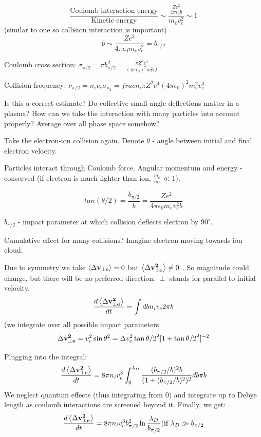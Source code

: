 \[\frac{\text{Coulomb interaction energy}}{\text{Kinetic energy}} \sim \frac{\frac{Ze^2}{4 \pi \epsilon_0 b}}{m_e v_e^2} \sim 1 \]
(similar to one so collision interaction is important)
\[b \sim \frac{Ze^2}{4 \pi \epsilon_0 m_e v_e^2} = b_{\pi/2} \]

Coulomb cross section: $\sigma_{\pi/2} = \pi b_{\pi/2}^2 = \frac{\pi Z^2 e^4}{(4 \pi \epsilon_0)^2 m_e^2 v_e^4}$

Collision frequency: $\nu_{\pi/2} = n_i v_e \sigma_{\pi_2} = frac{n_i \pi Z^2 e^4}{(4 \pi \epsilon_0)^2 m_e^2 v_e^3}$

Is this a correct estimate? Do collective small angle deflections matter in a plasma? How can we take the interaction with many particles into account properly? Average over all phase space somehow?

Take the electron-ion collision again.
Denote $\theta$ - angle between initial and final electron velocity.

Particles interact through Coulomb force. Angular momentum and energy - conserved (if electron is much lighter than ion, $\frac{m_e}{m_i} \ll 1$).

\[ tan(\theta/2) = \frac{b_{\pi/2}}{b} = \frac{Ze^2}{4 \pi \epsilon_0 m_e v_e^2 b} \]

$b_{\pi/2}$ - impact parameter at which collision deflects electron by $90^\circ$.

Cumulative effect for many collisions? Imagine electron moving towards ion cloud.

Due to symmetry we take $\left< \Delta \mathbf{v_{\perp e}} \right> =0$ but $\left< \Delta \mathbf{v_{\perp e}^2} \right> \neq 0$ . So magnitude could change, but there will be no preferred direction. $\perp$ stands for parallel to initial velocity.
\[\frac{d \left< \Delta \mathbf{v_{\perp e}^2} \right>}{d t} =\int db n_i v_e 2 \pi b \]
(we integrate over all possible impact parameters
\[ \Delta \mathbf{v_{\perp e}^2} = v_e^2 \sin{\theta}^2 = \Delta v_e^2 \tan{\theta/2}^2 [1+\tan{\theta/2}^2]^{-2} \]

Plugging into the integral:
\[\frac{d \left< \Delta \mathbf{v_{\perp e}^2} \right>}{d t} =8 \pi n_i v_e^3 \int_0^{\lambda_D} \frac{(b_{\pi/2} / b)^2 b}{(1+(b_{\pi/2} / b)^2)^2} db \pi b \]
We neglect quantum effects (thus integrating from 0) and integrate up to Debye length as coulomb interactions are screened beyond it. Finally, we get:
\[\frac{d \left< \Delta \mathbf{v_{\perp e}^2} \right>}{d t} = 8 \pi n_i v_e^3 b_{\pi/2}^2 \ln{\frac{\lambda_D}{b_{\pi/2}}} \text{(if $\lambda_D \gg b_{\pi/2}$} \]

